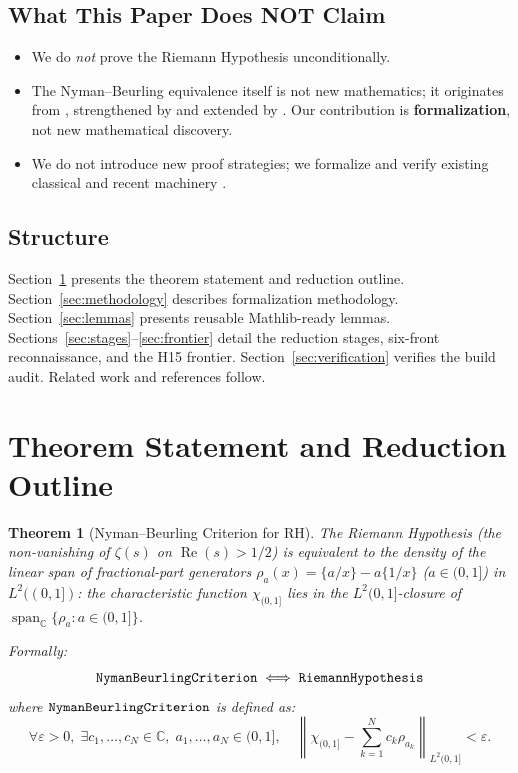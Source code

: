 \documentclass[11pt,a4paper]{article}
\theoremstyle{plain}
\newtheorem{theorem}{Theorem}[section]
\theoremstyle{definition}
\theoremstyle{remark}
\newcommand{\eps}{\varepsilon}
\DeclareMathOperator{\RePart}{Re}
\renewcommand{\Re}{\RePart}
\begin{document}
\subsection{What This Paper Does NOT Claim}

\begin{itemize}[leftmargin=2em]
  \item We do \emph{not} prove the Riemann Hypothesis unconditionally.
  \item The Nyman--Beurling equivalence itself is not new mathematics; it originates from \cite{Nyman1950,Beurling1955}, strengthened by \cite{BaezDuarte2003} and extended by \cite{BettinConreyFarmer2020}. Our contribution is \textbf{formalization}, not new mathematical discovery.
  \item We do not introduce new proof strategies; we formalize and verify existing classical and recent machinery \cite{Vasyunin1995,Estermann1928,MatomakiRadziwill2023}.
\end{itemize}

\subsection{Structure}

Section~\ref{sec:theorem} presents the theorem statement and reduction outline. Section~\ref{sec:methodology} describes formalization methodology. Section~\ref{sec:lemmas} presents reusable Mathlib-ready lemmas. Sections~\ref{sec:stages}--\ref{sec:frontier} detail the reduction stages, six-front reconnaissance, and the H15 frontier. Section~\ref{sec:verification} verifies the build audit. Related work and references follow.

\section{Theorem Statement and Reduction Outline}
\label{sec:theorem}

\begin{theorem}[Nyman--Beurling Criterion for RH]\label{thm:main}
The Riemann Hypothesis (the non-vanishing of $\zeta(s)$ on $\Re(s) > 1/2$) is equivalent to the density of the linear span of fractional-part generators $\rho_a(x) = \{a/x\} - a\{1/x\}$ ($a \in (0,1]$) in $L^2((0,1])$: the characteristic function $\chi_{(0,1]}$ lies in the $L^2(0,1]$-closure of $\operatorname{span}_{\mathbb{C}} \{\rho_a : a \in (0,1]\}$.

Formally:
\[
\text{\texttt{NymanBeurlingCriterion}} \iff \text{\texttt{RiemannHypothesis}}
\]
where $\text{\texttt{NymanBeurlingCriterion}}$ is defined as:
\[
\forall \eps > 0, \; \exists c_1, \dots, c_N \in \mathbb{C}, \; a_1, \dots, a_N \in (0,1], \quad \left\| \chi_{(0,1]} - \sum_{k=1}^N c_k \rho_{a_k} \right\|_{L^2(0,1]} < \eps.
\]
\end{theorem}
\end{document}
